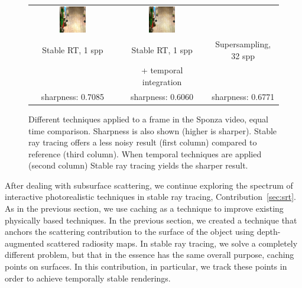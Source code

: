 \begin{figure}[t]
\begin{tabular}{@{}c@{}c@{}@{}c@{}}
	 	 \includegraphics[width=0.32\textwidth]{figures/srt_1_ti_rect_370_300_300_300_frame_211.png} &
	  \includegraphics[width=0.32\textwidth]{figures/ss_32x_rect_370_300_300_300_frame_211.png}
 \\
Stable RT, 1 spp & Stable RT, 1 spp & Supersampling, 32 spp \\
 & + temporal integration &  \\
sharpness: 0.7085 & sharpness: 0.6060 & sharpness: 0.6771 \\[-1.5ex]
\end{tabular}
\caption{Different techniques applied to a frame in the Sponza video, equal time comparison. Sharpness is also shown (higher is sharper). Stable ray tracing offers a less noisy result (first column) compared to reference (third column). When temporal techniques are applied (second column) Stable ray tracing yields the sharper result.  }
\label{fig:sponza_video_frame}
\end{figure}

After dealing with subsurface scattering, we continue exploring the spectrum of interactive photorealistic techniques in stable ray tracing, Contribution~\ref{sec:srt}. As in the previous section, we use caching as a technique to improve existing physically based techniques. In the previous section, we created a technique that anchors the scattering contribution to the surface of the object using depth-augmented scattered radiosity maps. In stable ray tracing, we solve a completely different problem, but that in the essence has the same overall purpose, caching points on surfaces. In this contribution, in particular, we track these points in order to achieve temporally stable renderings. 


